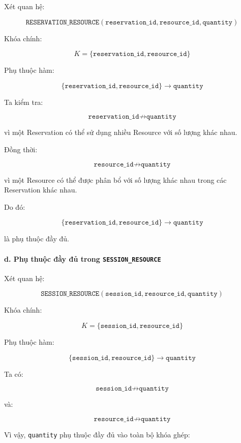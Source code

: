 Xét quan hệ:

$$
\texttt{RESERVATION\_RESOURCE}(
\texttt{reservation\_id},
\texttt{resource\_id},
\texttt{quantity})
$$

Khóa chính:

$$
K =
\{
\texttt{reservation\_id},
\texttt{resource\_id}
\}
$$

Phụ thuộc hàm:

$$
\{
\texttt{reservation\_id},
\texttt{resource\_id}
\}
\rightarrow
\texttt{quantity}
$$

Ta kiểm tra:

$$
\texttt{reservation\_id}
\not\rightarrow
\texttt{quantity}
$$

vì một Reservation có thể sử dụng nhiều Resource với số lượng khác nhau.

Đồng thời:

$$
\texttt{resource\_id}
\not\rightarrow
\texttt{quantity}
$$

vì một Resource có thể được phân bổ với số lượng khác nhau trong các Reservation khác nhau.

Do đó:

$$
\{
\texttt{reservation\_id},
\texttt{resource\_id}
\}
\rightarrow
\texttt{quantity}
$$

là phụ thuộc đầy đủ.

\paragraph{d. Phụ thuộc đầy đủ trong \texttt{SESSION\_RESOURCE}}\mbox{}\par

Xét quan hệ:

$$
\texttt{SESSION\_RESOURCE}(
\texttt{session\_id},
\texttt{resource\_id},
\texttt{quantity})
$$

Khóa chính:

$$
K =
\{
\texttt{session\_id},
\texttt{resource\_id}
\}
$$

Phụ thuộc hàm:

$$
\{
\texttt{session\_id},
\texttt{resource\_id}
\}
\rightarrow
\texttt{quantity}
$$

Ta có:

$$
\texttt{session\_id}
\not\rightarrow
\texttt{quantity}
$$

và:

$$
\texttt{resource\_id}
\not\rightarrow
\texttt{quantity}
$$

Vì vậy, \texttt{quantity} phụ thuộc đầy đủ vào toàn bộ khóa ghép:

